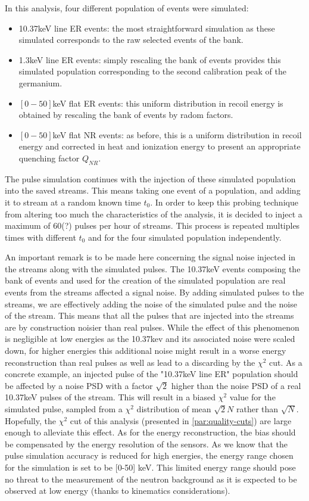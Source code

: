 In this analysis, four different population of events were simulated:
\begin{itemize}
	\item 10.37keV line ER events: the most straightforward simulation as these simulated corresponds to the raw selected events of the bank.
	\item 1.3keV line ER events: simply rescaling the bank of events provides this simulated population corresponding to the second calibration peak of the germanium.
	\item $[0-50]$keV flat ER events: this uniform distribution in recoil energy is obtained by rescaling the bank of events by radom factors.
	\item $[0-50]$keV flat NR events: as before, this is a uniform distribution in recoil energy and corrected in heat and ionization energy to present an appropriate quenching factor $Q_{NR}$.
\end{itemize}

The pulse simulation continues with the injection of these simulated population into the saved streams. This means taking one event of a population, and adding it to stream at a random known time $t_0$. In order to keep this probing technique from altering too much the characteristics of the analysis, it is decided to inject a maximum of 60(?) pulses per hour of streams. This process is repeated multiples times with different $t_0$ and for the four simulated population independently.

An important remark is to be made here concerning the signal noise injected in the streams along with the simulated pulses. The 10.37keV events composing the bank of events and used for the creation of the simulated population are real events from the streams affected a signal noise. By adding simulated pulses to the streams, we are effectively adding the noise of the simulated pulse and the noise of the stream. This means that all the pulses that are injected into the streams are by construction noisier than real pulses.
While the effect of this phenomenon is negligible at low energies as the 10.37kev and its associated noise were scaled down, for higher energies this additional noise might result in a worse energy reconstruction than real pulses as well as lead to a discarding by the $\chi^2$ cut.
As a concrete example, an injected pulse of the "10.37keV line ER" population should be affected by a noise PSD with a factor $\sqrt{2}$ higher than the noise PSD of a real 10.37keV pulses of the stream. This will result in a biased $\chi^2$ value for the simulated pulse, sampled from a $\chi^2$ distribution of mean $\sqrt{2}N$ rather than $\sqrt{N}$. Hopefully, the $\chi^2$ cut of this analysis (presented in \ref{par:quality-cuts}) are large enough to alleviate this effect. As for the energy reconstruction, the bias should be compensated by the energy resolution of the sensors.
As we know that the pulse simulation accuracy is reduced for high energies, the energy range chosen for the simulation is set to be [0-50] keV. This limited energy range should pose no threat to the measurement of the neutron background as it is expected to be observed at low energy (thanks to kinematics considerations).

